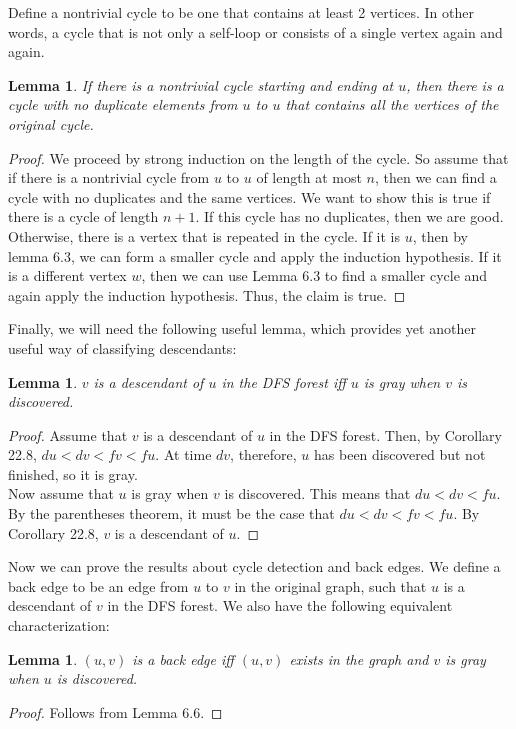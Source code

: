 \documentclass{article}
\newtheorem{lemma}[theorem]{Lemma}
\begin{document}
Define a nontrivial cycle to be one that contains at least 2 vertices. In other words, a cycle that is not only a self-loop or consists of a single vertex again and again.
\begin{lemma}
If there is a nontrivial cycle starting and ending at $u$, then there is a cycle with no duplicate elements from $u$ to $u$ that contains all the vertices of the original cycle.
\end{lemma}
\begin{proof}
We proceed by strong induction on the length of the cycle. So assume that if there is a nontrivial cycle from $u$ to $u$ of length at most $n$, then we can find a cycle with no duplicates and the same vertices. We want to show this is true if there is a cycle of length $n+1$. If this cycle has no duplicates, then we are good. Otherwise, there is a vertex that is repeated in the cycle. If it is $u$, then by lemma 6.3, we can form a smaller cycle and apply the induction hypothesis. If it is a different vertex $w$, then we can use Lemma 6.3 to find a smaller cycle and again apply the induction hypothesis. Thus, the claim is true.
\end{proof}
Finally, we will need the following useful lemma, which provides yet another useful way of classifying descendants:
\begin{lemma}
$v$ is a descendant of $u$ in the DFS forest iff $u$ is gray when $v$ is discovered.
\end{lemma}
\begin{proof}
Assume that $v$ is a descendant of $u$ in the DFS forest. Then, by Corollary 22.8, $du < dv < fv < fu$. At time $dv$, therefore, $u$ has been discovered but not finished, so it is gray.
\\Now assume that $u$ is gray when $v$ is discovered. This means that $du < dv < fu$. By the parentheses theorem, it must be the case that $du < dv < fv < fu$. By Corollary 22.8, $v$ is a descendant of $u$.
\end{proof}
Now we can prove the results about cycle detection and back edges. We define a back edge to be an edge from $u$ to $v$ in the original graph, such that $u$ is a descendant of $v$ in the DFS forest. We also have the following equivalent characterization:
\begin{lemma}
$(u,v)$ is a back edge iff $(u,v)$ exists in the graph and $v$ is gray when $u$ is discovered.
\end{lemma}
\begin{proof}
Follows from Lemma 6.6.
\end{proof}
\end{document}
